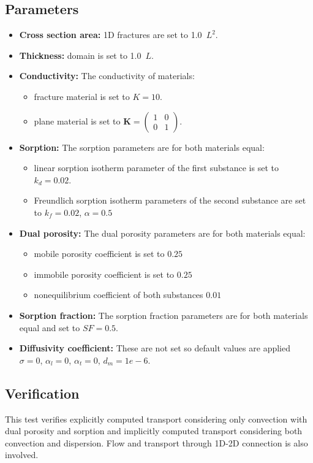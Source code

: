 \subsection*{Parameters}
\begin{itemize}
  \item \textbf{Cross section area:} 1D fractures are set to 1.0~$L^2$.
  \item \textbf{Thickness:} domain is set to 1.0~$L$.
  \item \textbf{Conductivity:} The conductivity of materials:
    \begin{itemize}
      \item fracture material is set to $K=10$.
      \item plane material is set to $\mathbf{K}=\left(\begin{array}{cc} 1 & 0 \\ 0 & 1\end{array} \right)$.
    \end{itemize}
  \item \textbf{Sorption:} The sorption parameters are for both materials equal:
    \begin{itemize}
      \item linear sorption isotherm parameter of the first substance is set to $k_d=0.02$.
      \item Freundlich sorption isotherm parameters of the second substance are set to $k_f=0.02$, $\alpha=0.5$  
    \end{itemize}
  \item \textbf{Dual porosity:} The dual porosity parameters are for both materials equal:
    \begin{itemize}
      \item mobile porosity coefficient is set to $0.25$
      \item immobile porosity coefficient is set to $0.25$
      \item nonequilibrium coefficient of both substances $0.01$
    \end{itemize}
  \item \textbf{Sorption fraction:} The sorption fraction parameters are for both materials equal and set to $SF=0.5$.
  \item \textbf{Diffusivity coefficient:} These are not set so default values are applied 
	$\sigma=0$, $\alpha_l=0$, $\alpha_t=0$, $d_m=1e-6$.
\end{itemize}

\subsection*{Verification}
This test verifies explicitly computed transport considering only convection with dual porosity and sorption and implicitly computed transport considering both convection and dispersion. Flow and transport through 1D-2D connection is also involved.



